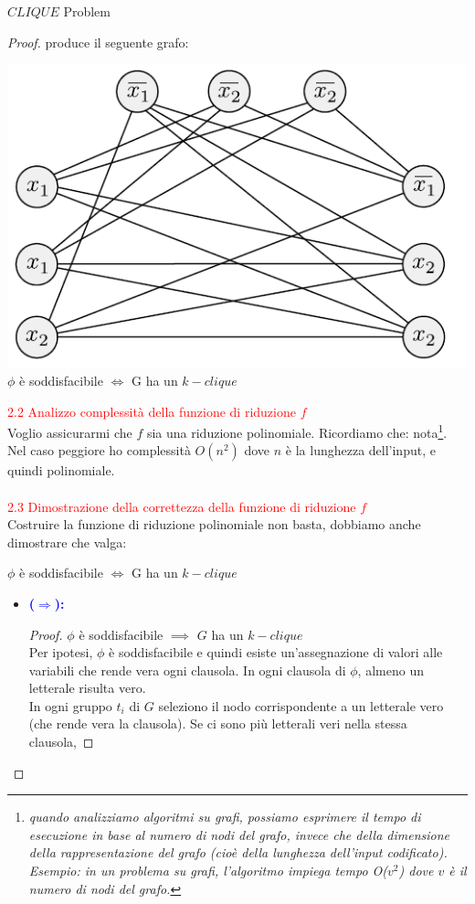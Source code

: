 \documentclass{article}  %
\theoremstyle{definition}
\begin{document}
\begin{theorem}{$CLIQUE$ Problem}
\begin{proof}
		produce il seguente grafo:
		\begin{center}
			\includegraphics[width=0.5\linewidth]{clique-npcomplete.png} \\
			$\phi$ è soddisfacibile $\iff$ G ha un $k-clique$
		\end{center}

		\textcolor{red}{2.2 Analizzo complessità della funzione di riduzione $f$} \\
		Voglio assicurarmi che $f$ sia una riduzione polinomiale. Ricordiamo che: nota\footnote{\textit{quando analizziamo algoritmi su grafi, possiamo esprimere il tempo di esecuzione
				in base al numero di nodi del grafo, invece che della dimensione della rappresentazione del grafo (cioè della lunghezza dell'input codificato). Esempio: in un problema su grafi,
				l'algoritmo impiega tempo O($v^2$) dove $v$ è il numero di nodi del grafo.}}. \\
		Nel caso peggiore ho complessità $O(n^2)$ dove $n$ è la lunghezza dell'input, e quindi polinomiale. \\ \\
		\textcolor{red}{2.3 Dimostrazione della correttezza della funzione di riduzione $f$} \\
		Costruire la funzione di riduzione polinomiale non basta, dobbiamo anche dimostrare che valga:
		\begin{center}
			$\phi$ è soddisfacibile $\iff$ G ha un $k-clique$
		\end{center}
		\begin{itemize}
			\item \textcolor{blue}{\textbf{($\Longrightarrow$):}}
			      \begin{proof}
				      $\phi$ è soddisfacibile $\implies$ $G$ ha un $k-clique$ \\
				      Per ipotesi, $\phi$ è soddisfacibile e quindi esiste un'assegnazione di valori
				      alle variabili che rende vera ogni clausola.
				      In ogni clausola di $\phi$, almeno un letterale risulta vero. \\
				      In ogni gruppo $t_i$ di $G$ seleziono il nodo corrispondente a un letterale vero (che rende vera la clausola). Se ci sono più letterali veri nella stessa clausola,

\end{proof}
\end{itemize}
\end{proof}
\end{theorem}
\end{document}
